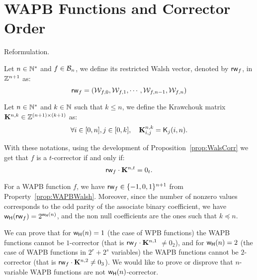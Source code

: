 \documentclass[11pt]{llncs}
\begin{document}
\section{WAPB Functions and Corrector Order}


Reformulation.

\begin{definition}\label{def:restWalshVect}
Let $n\in \mathbb{N}^*$ and $f\in \mathcal{B}_n$, we define its restricted Walsh vector, denoted by $\mathsf{rw}_{f}$, in $\mathbb{Z}^{n+1}$ as:
\[\mathsf{rw}_{f}=(\mathcal{W}_{f,0},\mathcal{W}_{f,1},\cdots,\mathcal{W}_{f,n-1},\mathcal{W}_{f,n})\]

\end{definition}


\begin{definition}\label{def:KrMat}
	Let $n\in \mathbb{N}^*$ and $k\in \mathbb{N}$ such that $k\le n$, we define the Krawchouk matrix
	$\mathbf{K}^{n,k}\in 	\mathbb{Z}^{(n+1)\times (k+1)}$ as:
	\[\forall i \in [0,n], j\in [0,k], \quad \mathbf{K}^{n,k}_{i,j}=\mathsf{K}_{j}(i,n).\]

\end{definition}

With these notations, using the development of Proposition~\ref{prop:WalsCorr} we get that $f$ is a $t$-corrector if and only if:
\[\mathsf{rw}_{f} \cdot \mathbf{K}^{n,t}=0_t.\]

For a WAPB function $f$, we have $\mathsf{rw}_{f}\in \{-1,0,1\}^{n+1}$ from Property~\ref{prop:WAPBWalsh}. Moreover, since the number of nonzero values corresponds to the odd parity of the associate binary coefficient, we have $\mathsf{w_H}(\mathsf{rw}_{f})=2^{\mathsf{w_H}(n)}$, and the non null coefficients are the ones such that $k\preceq n$.


We can prove that for $\mathsf{w_H}(n)=1$ (the case of WPB functions) the WAPB functions cannot be $1$-corrector
(that is $\mathsf{rw}_{f} \cdot \mathbf{K}^{n,1}$
$\neq 0_2$), and for
 $\mathsf{w_H}(n)=2$
  (the case of WAPB functions in $2^r +2^s$ variables) the WAPB functions
 cannot be $2$-corrector (that is $\mathsf{rw}_{f} \cdot \mathbf{K}^{n,2} \ne 0_3$).
We would like to prove or disprove that $n$-variable WAPB functions are not $\mathsf{w_H}(n)$-corrector.
\end{document}
